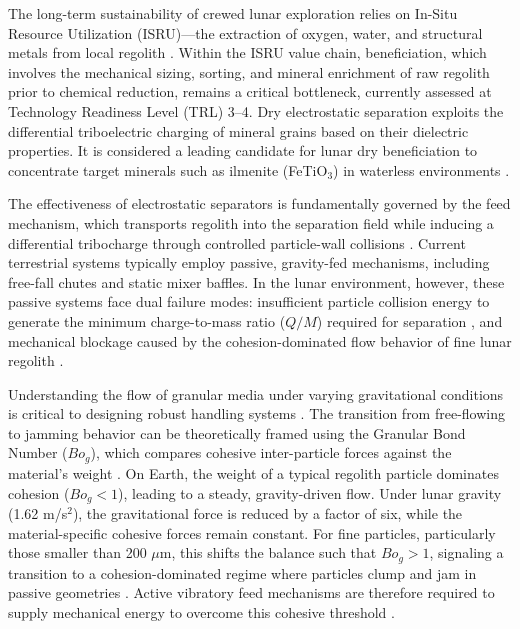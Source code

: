 \documentclass[preprint,12pt,authoryear]{elsarticle}
\begin{document}
The long-term sustainability of crewed lunar exploration relies on In-Situ Resource Utilization (ISRU)---the extraction of oxygen, water, and structural metals from local regolith \citep{ISECG2021, Li2018}. Within the ISRU value chain, beneficiation, which involves the mechanical sizing, sorting, and mineral enrichment of raw regolith prior to chemical reduction, remains a critical bottleneck, currently assessed at Technology Readiness Level (TRL) 3--4. Dry electrostatic separation exploits the differential triboelectric charging of mineral grains based on their dielectric properties. It is considered a leading candidate for lunar dry beneficiation to concentrate target minerals such as ilmenite (FeTiO$_3$) in waterless environments \citep{Trigwell2009, Trigwell2006, Trigwell2007}.

The effectiveness of electrostatic separators is fundamentally governed by the feed mechanism, which transports regolith into the separation field while inducing a differential tribocharge through controlled particle-wall collisions \citep{Franke2024}. Current terrestrial systems typically employ passive, gravity-fed mechanisms, including free-fall chutes and static mixer baffles. In the lunar environment, however, these passive systems face dual failure modes: insufficient particle collision energy to generate the minimum charge-to-mass ratio ($Q/M$) required for separation \citep{Trigwell2009}, and mechanical blockage caused by the cohesion-dominated flow behavior of fine lunar regolith \citep{Colwell2007, Taylor2010}.

Understanding the flow of granular media under varying gravitational conditions is critical to designing robust handling systems \citep{Murdoch2013, Murdoch2012}. The transition from free-flowing to jamming behavior can be theoretically framed using the Granular Bond Number ($Bo_g$), which compares cohesive inter-particle forces against the material's weight \citep{Madden2025, Scheeres2010}. On Earth, the weight of a typical regolith particle dominates cohesion ($Bo_g < 1$), leading to a steady, gravity-driven flow. Under lunar gravity (1.62 m/s$^2$), the gravitational force is reduced by a factor of six, while the material-specific cohesive forces remain constant. For fine particles, particularly those smaller than 200 $\mu$m, this shifts the balance such that $Bo_g > 1$, signaling a transition to a cohesion-dominated regime where particles clump and jam in passive geometries \citep{Hartzell2011, Scheeres2010}. Active vibratory feed mechanisms are therefore required to supply mechanical energy to overcome this cohesive threshold \citep{Richards2004}.
\end{document}
